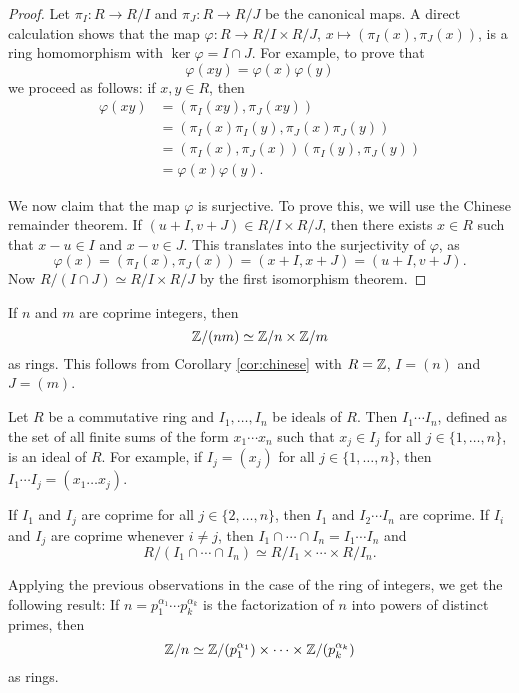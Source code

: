 \begin{proof}
	Let $\pi_I\colon R\to R/I$ and $\pi_J\colon R\to R/J$ be the canonical maps. A direct 
	calculation shows that the
	map $\varphi\colon R\to R/I\times R/J$, $x\mapsto (\pi_I(x),\pi_J(x))$, 
	is a ring homomorphism with $\ker\varphi=I\cap J$. For example, to prove
 that 
 \[
 \varphi(xy)=\varphi(x)\varphi(y)
 \]
 we proceed as follows: if $x,y\in R$, then 
        \begin{align*}
            \varphi(xy) &= (\pi_I(xy),\pi_J(xy))\\
            &= (\pi_I(x)\pi_I(y),\pi_J(x)\pi_J(y))\\
            &= (\pi_I(x),\pi_J(x))(\pi_I(y),\pi_J(y))\\
            &= \varphi(x)\varphi(y). 
        \end{align*}

 We now claim that the map $\varphi$ is surjective. To prove this, 
 we will use the Chinese remainder theorem. If $(u+I,v+J)\in R/I\times R/J$, 
	then there exists $x\in R$ such that 
	$x-u\in I$ and $x-v\in J$. This translates into the surjectivity of $\varphi$,
 as \[
 \varphi(x)=(\pi_I(x),\pi_J(x))=(x+I,x+J)=(u+I,v+J).
 \]
 Now
	$R/(I\cap J)\simeq R/I\times R/J$ by the first isomorphism theorem. 
\end{proof}

\begin{example}
    If $n$ and $m$ are coprime integers, then
    \[
    \mathbb{Z}/(nm)\simeq \mathbb{Z}/n\times \mathbb{Z}/m
    \]
    as rings. This follows from Corollary \ref{cor:chinese} with 
    $R=\mathbb{Z}$, $I=(n)$ and $J=(m)$. 
\end{example}

Let $R$ be a commutative ring and $I_1,\dots,I_n$ be ideals of $R$. Then
$I_1\cdots I_n$, defined as the set of all finite sums of the form 
$x_1\cdots x_n$ such that $x_j\in I_j$ for all $j\in\{1,\dots,n\}$, 
is an ideal of $R$. For example, if $I_j=(x_j)$ for all $j\in\{1,\dots,n\}$, 
then $I_1\cdots I_j=(x_1\dots x_j)$. 

If $I_1$ and $I_j$ are coprime for all $j\in\{2,\dots,n\}$, 
then $I_1$ and $I_2\cdots I_n$ are coprime. If $I_i$ and $I_j$ are coprime
whenever $i\ne j$, then 
$I_1\cap\cdots\cap I_n=I_1\cdots I_n$ and 
\[
R/(I_1\cap\cdots\cap I_n)\simeq R/I_1\times\cdots\times R/I_n.
\]

Applying the previous observations in the case of the ring of integers, we get the following result: If $n=p_1^{\alpha_1}\cdots p_k^{\alpha_k}$ is the factorization 
of $n$ into powers of distinct primes, then 
\[
\mathbb{Z}/n\simeq \mathbb{Z}/(p_1^{\alpha_1})\times\cdots \times \mathbb{Z}/(p_k^{\alpha_k})
\]
as rings. 

